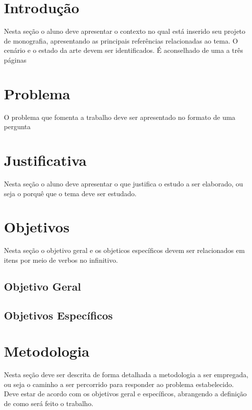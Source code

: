 \documentclass[a4paper,12pt]{article}
\begin{document}


\newpage
\tableofcontents

\newpage
\section{Introdução}
\label{sc:introducao}
Nesta seção o aluno deve apresentar o contexto no qual está inserido seu projeto de monografia, apresentando as principais referências relacionadas ao tema. O cenário e o estado da arte devem ser identificados. É aconselhado de uma a três páginas

\section{Problema}
\label{sc:problema}
O problema que fomenta a trabalho deve ser apresentado no formato de uma pergunta
\section{Justificativa}
Nesta seção o aluno deve apresentar o que justifica o estudo a ser elaborado, ou seja o porquê que o tema deve ser estudado.

\section{Objetivos}
\label{sc:objetivos}
Nesta seção o objetivo geral e os objeticos específicos devem ser relacionados em itens por meio de verbos no infinitivo.
\subsection{Objetivo Geral}
\subsection{Objetivos Específicos}

\section{Metodologia}
\label{sc:metodologia}
Nesta seção deve ser descrita de forma detalhada a metodologia a ser empregada, ou seja  o caminho a ser percorrido para responder ao problema estabelecido. Deve estar de acordo com os
objetivos geral e específicos, abrangendo a definição de como será feito o trabalho.

\end{document}
